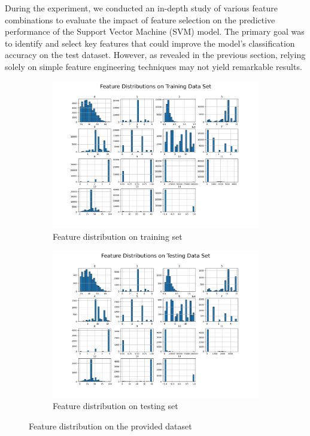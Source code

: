 \documentclass[a4paper, utf8]{ctexart}
\begin{document}
	During the experiment, we conducted an in-depth study of various feature combinations to evaluate the impact of feature selection on the predictive performance of the Support Vector Machine (SVM) model. The primary goal was to identify and select key features that could improve the model's classification accuracy on the test dataset. However, as revealed in the previous section, relying solely on simple feature engineering techniques may not yield remarkable results.
	
	\begin{figure}[htbp]
		\centering
		\begin{subfigure}{.48\textwidth}
			\centering
			\includegraphics[width=\textwidth]{./figure/myplotF1.png}
			\caption{Feature distribution on training set}
		\end{subfigure}
		\begin{subfigure}{.48\textwidth}
			\centering
			\includegraphics[width=\textwidth]{./figure/myplotF2.png}
			\caption{Feature distribution on testing set}
		\end{subfigure}
		\caption{Feature distribution on the provided dataset}
	\end{figure}
	
\end{document}
